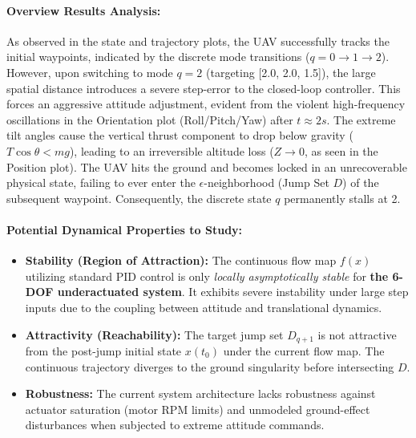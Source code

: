\documentclass{article}
\begin{document}
\paragraph{Overview Results Analysis:} As observed in the state and trajectory plots, the UAV successfully tracks the initial waypoints, indicated by the discrete mode transitions ($q = 0 \to 1 \to 2$). However, upon switching to mode $q=2$ (targeting [2.0, 2.0, 1.5]), the large spatial distance introduces a severe step-error to the closed-loop controller. This forces an aggressive attitude adjustment, evident from the violent high-frequency oscillations in the Orientation plot (Roll/Pitch/Yaw) after $t \approx 2s$. The extreme tilt angles cause the vertical thrust component to drop below gravity ($T\cos\theta < mg$), leading to an irreversible altitude loss ($Z \to 0$, as seen in the Position plot). The UAV hits the ground and becomes locked in an unrecoverable physical state, failing to ever enter the $\epsilon$-neighborhood (Jump Set $D$) of the subsequent waypoint. Consequently, the discrete state $q$ permanently stalls at 2.

\paragraph{Potential Dynamical Properties to Study:} 
\begin{itemize}
  \item \textbf{Stability (Region of Attraction):} The continuous flow map $f(x)$ utilizing standard PID control is only \textit{locally asymptotically stable} for \textbf{the 6-DOF underactuated system}. It exhibits severe instability under large step inputs due to the coupling between attitude and translational dynamics.
  \item \textbf{Attractivity (Reachability):} The target jump set $D_{q+1}$ is not attractive from the post-jump initial state $x(t_0)$ under the current flow map. The continuous trajectory diverges to the ground singularity before intersecting $D$.
  \item \textbf{Robustness:} The current system architecture lacks robustness against actuator saturation (motor RPM limits) and unmodeled ground-effect disturbances when subjected to extreme attitude commands.
\end{itemize}
\end{document}
